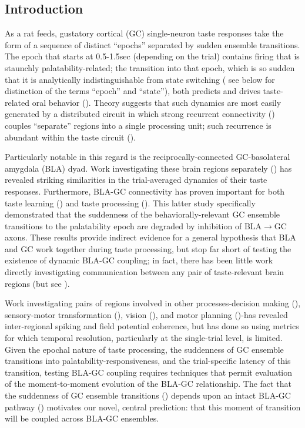 \begin{refsection}
\section{Introduction}
As a rat feeds, gustatory cortical (GC) single-neuron taste responses take the form of a sequence of distinct “epochs” separated by sudden ensemble transitions. The epoch that starts at 0.5-1.5sec (depending on the trial) contains firing that is staunchly palatability-related; the transition into that epoch, which is so sudden that it is analytically indistinguishable from state switching (\cite{sadacca2016a} see below for distinction of the terms “epoch” and “state”), both predicts and drives taste-related oral behavior (\cite{sadacca2012a,li2016a,mukherjee2019a}). Theory suggests that such dynamics are most easily generated by a distributed circuit in which strong recurrent connectivity (\cite{maass2007a, miller2010a, miller2013a,edelman2013a,mante2013a,kietzmann2019a}) couples “separate” regions into a single processing unit; such recurrence is abundant within the taste circuit (\cite{bielavska1996a,mcdonald1998a,shi1998a}).

Particularly notable in this regard is the reciprocally-connected GC-basolateral amygdala (BLA) dyad. Work investigating these brain regions separately (\cite{katz2001a,fontanini2009a,sadacca2012a}) has revealed striking similarities in the trial-averaged dynamics of their taste responses. Furthermore, BLA-GC connectivity has proven important for both taste learning (\cite{lin2012a,lin2015a,lavi2018a,kayyal2019a}) and taste processing (\cite{lin2021a}). This latter study specifically demonstrated that the suddenness of the behaviorally-relevant GC ensemble transitions to the palatability epoch are degraded by inhibition of BLA$\rightarrow$GC axons. These results provide indirect evidence for a general hypothesis that BLA and GC work together during taste processing, but stop far short of testing the existence of dynamic BLA-GC coupling; in fact, there has been little work directly investigating communication between any pair of taste-relevant brain regions (but see \cite{lorenzo1997a}).

Work investigating pairs of regions involved in other processes-decision making (\cite{antzoulatos2016a,place2016a,zielinski2019a}), sensory-motor transformation (\cite{arce-mcshane2016a}), vision (\cite{bastos2015a,zandvakili2015a,saravani2019a,lundqvist2020a}), and motor planning (\cite{yates2017a,ames2019a})-has revealed inter-regional spiking and field potential coherence, but has done so using metrics for which temporal resolution, particularly at the single-trial level, is limited. Given the epochal nature of taste processing, the suddenness of GC ensemble transitions into palatability-responsiveness, and the trial-specific latency of this transition, testing BLA-GC coupling requires techniques that permit evaluation of the moment-to-moment evolution of the BLA-GC relationship. The fact that the suddenness of GC ensemble transitions (\cite{sadacca2016a,mukherjee2019a}) depends upon an intact BLA-GC pathway (\cite{lin2021a}) motivates our novel, central prediction: that this moment of transition will be coupled across BLA-GC ensembles. 


\end{refsection}
